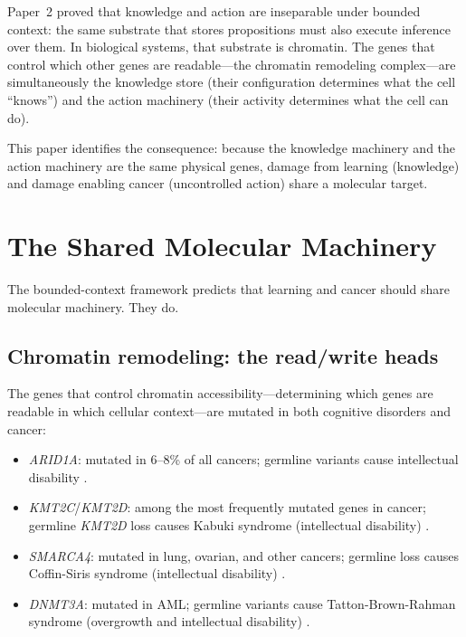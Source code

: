 \documentclass[11pt]{article}
\theoremstyle{definition}
\begin{document}
Paper~2 \cite{McCarthy2026_BCA} proved that knowledge and action
are inseparable under bounded context: the same substrate that
stores propositions must also execute inference over them.
In biological systems, that substrate is chromatin. The genes
that control which other genes are readable---the chromatin
remodeling complex---are simultaneously the knowledge store
(their configuration determines what the cell ``knows'') and
the action machinery (their activity determines what the cell
can do).

This paper identifies the consequence: because the knowledge
machinery and the action machinery are the same physical genes,
damage from learning (knowledge) and damage enabling cancer
(uncontrolled action) share a molecular target.

\section{The Shared Molecular Machinery}
\label{sec:machinery}

The bounded-context framework predicts that learning and cancer
should share molecular machinery. They do.

\subsection{Chromatin remodeling: the read/write heads}

The genes that control chromatin accessibility---determining which
genes are readable in which cellular context---are mutated in both
cognitive disorders and cancer:

\begin{itemize}
\item \emph{ARID1A}: mutated in 6--8\% of all cancers; germline
variants cause intellectual disability \cite{Santen2012}.
\item \emph{KMT2C}/\emph{KMT2D}: among the most frequently mutated
genes in cancer; germline \emph{KMT2D} loss causes Kabuki syndrome
(intellectual disability) \cite{Miyake2013}.
\item \emph{SMARCA4}: mutated in lung, ovarian, and other cancers;
germline loss causes Coffin-Siris syndrome (intellectual
disability) \cite{Tsurusaki2012}.
\item \emph{DNMT3A}: mutated in AML; germline variants cause
Tatton-Brown-Rahman syndrome (overgrowth and intellectual
disability) \cite{Tatton-Brown2014}.
\end{itemize}
\end{document}
